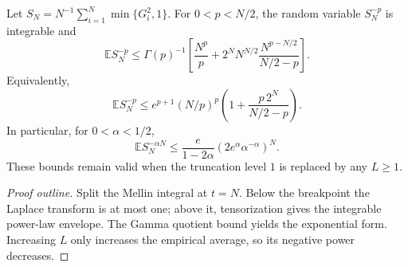 \begin{lemma}
  \label{lem:gaussian-truncated-negative-moment}
  \leanok
  Let $S_N=N^{-1}\sum_{i=1}^N\min\{G_i^2,1\}$. For
  $0<p<N/2$, the random variable $S_N^{-p}$ is integrable and
  \[
    \mathbb E S_N^{-p}
    \leq \Gamma(p)^{-1}
      \left[
        \frac{N^p}{p}
        +2^N N^{N/2}\frac{N^{p-N/2}}{N/2-p}
      \right].
  \]
  Equivalently,
  \[
    \mathbb E S_N^{-p}
    \le e^{p+1}(N/p)^p
      \left(1+\frac{p\,2^N}{N/2-p}\right).
  \]
  In particular, for $0<\alpha<1/2$,
  \[
    \mathbb E S_N^{-\alpha N}
    \le \frac{e}{1-2\alpha}
      \left(2e^\alpha\alpha^{-\alpha}\right)^N.
  \]
  These bounds remain valid when the truncation level $1$ is replaced by any
  $L\geq1$.
\end{lemma}
\begin{proof}[Proof outline]
  \leanok
  Split the Mellin integral at $t=N$. Below the breakpoint the Laplace
  transform is at most one; above it, tensorization gives the integrable
  power-law envelope. The Gamma quotient bound yields the exponential form.
  Increasing $L$ only increases the empirical average, so its negative power
  decreases.
\end{proof}

